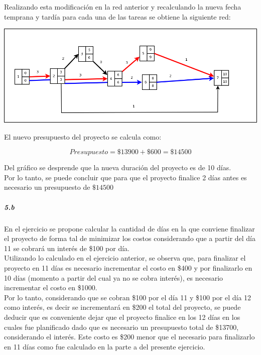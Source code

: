 \documentclass[a4paper,10pt]{article}
\begin{document}
Realizando esta modificaci\'on en la red anterior y recalculando la nueva fecha temprana y tard\'ia para cada una de las tareas se obtiene la siguiente red:

  \begin{center}
    \includegraphics[scale=0.4,keepaspectratio=true]{img/ej5-2red.png} 
  \end{center}

El nuevo presupuesto del proyecto se calcula como:

$$ Presupuesto = \$13900 + \$600 = \$14500 $$

Del gr\'afico se desprende que la nueva duraci\'on del proyecto es de 10 d\'ias.\\

Por lo tanto, se puede concluir que para que el proyecto finalice 2 d\'ias antes es necesario un presupuesto de $\$14500$

\subparagraph {5.b}

En el ejercicio se propone calcular la cantidad de d\'ias en la que conviene finalizar el proyecto de forma tal de minimizar los costos considerando que a partir del d\'ia 11 se cobrar\'a un inter\'es
de \$100 por d\'ia.\\
Utilizando lo calculado en el ejercicio anterior, se observa que, para finalizar el proyecto en 11 d\'ias es necesario incrementar el costo en \$400 y por finalizarlo en 10 d\'ias (momento a partir del cual ya no se 
cobra inter\'es), es necesario incrementar el costo en \$1000. \\

Por lo tanto, considerando que se cobran \$100 por el d\'ia 11 y \$100 por el d\'ia 12 como inter\'es, es decir se incrementar\'a en \$200 el total del proyecto, se puede deducir que 
es conveniente dejar que el proyecto finalice en los 12 d\'ias en los cuales fue planificado dado que es necesario un presupuesto total de \$13700, considerando el inter\'es. Este costo es 
\$200 menor que el necesario para finalizarlo en 11 d\'ias como fue calculado en la parte a del presente ejercicio.
\end{document}
